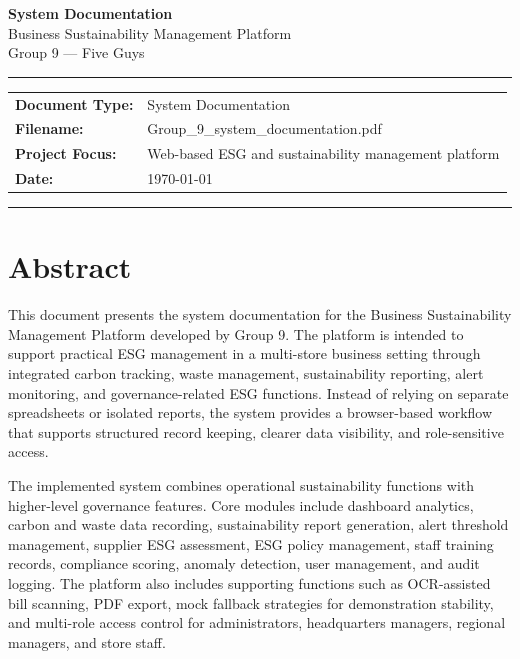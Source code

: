 \documentclass[11pt,a4paper]{article}
\begin{document}
\begin{center}
{\LARGE \textbf{System Documentation}}\\[0.4em]
{\Large Business Sustainability Management Platform}\\[0.6em]
{\large Group 9 --- Five Guys}
\end{center}

\vspace{0.4em}
\hrule
\vspace{0.6em}
\begin{tabular}{@{}ll}
\textbf{Document Type:}  & System Documentation \\
\textbf{Filename:}       & Group\_9\_system\_documentation.pdf \\
\textbf{Project Focus:}  & Web-based ESG and sustainability management platform \\
\textbf{Date:}           & \today \\
\end{tabular}
\vspace{0.4em}
\hrule

\vspace{1em}
\tableofcontents
\newpage

\section*{Abstract}
This document presents the system documentation for the Business Sustainability Management Platform developed by Group 9. The platform is intended to support practical ESG management in a multi-store business setting through integrated carbon tracking, waste management, sustainability reporting, alert monitoring, and governance-related ESG functions. Instead of relying on separate spreadsheets or isolated reports, the system provides a browser-based workflow that supports structured record keeping, clearer data visibility, and role-sensitive access.

The implemented system combines operational sustainability functions with higher-level governance features. Core modules include dashboard analytics, carbon and waste data recording, sustainability report generation, alert threshold management, supplier ESG assessment, ESG policy management, staff training records, compliance scoring, anomaly detection, user management, and audit logging. The platform also includes supporting functions such as OCR-assisted bill scanning, PDF export, mock fallback strategies for demonstration stability, and multi-role access control for administrators, headquarters managers, regional managers, and store staff.
\end{document}
